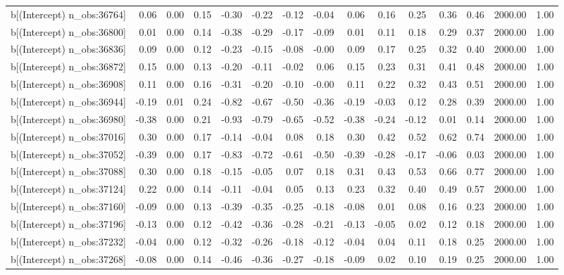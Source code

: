 \begin{table}[ht]
\begin{tabular}{rrrrrrrrrrrrrrr}
  b[(Intercept) n\_obs:36764] & 0.06 & 0.00 & 0.15 & -0.30 & -0.22 & -0.12 & -0.04 & 0.06 & 0.16 & 0.25 & 0.36 & 0.46 & 2000.00 & 1.00 \\ 
  b[(Intercept) n\_obs:36800] & 0.01 & 0.00 & 0.14 & -0.38 & -0.29 & -0.17 & -0.09 & 0.01 & 0.11 & 0.18 & 0.29 & 0.37 & 2000.00 & 1.00 \\ 
  b[(Intercept) n\_obs:36836] & 0.09 & 0.00 & 0.12 & -0.23 & -0.15 & -0.08 & -0.00 & 0.09 & 0.17 & 0.25 & 0.32 & 0.40 & 2000.00 & 1.00 \\ 
  b[(Intercept) n\_obs:36872] & 0.15 & 0.00 & 0.13 & -0.20 & -0.11 & -0.02 & 0.06 & 0.15 & 0.23 & 0.31 & 0.41 & 0.48 & 2000.00 & 1.00 \\ 
  b[(Intercept) n\_obs:36908] & 0.11 & 0.00 & 0.16 & -0.31 & -0.20 & -0.10 & -0.00 & 0.11 & 0.22 & 0.32 & 0.43 & 0.51 & 2000.00 & 1.00 \\ 
  b[(Intercept) n\_obs:36944] & -0.19 & 0.01 & 0.24 & -0.82 & -0.67 & -0.50 & -0.36 & -0.19 & -0.03 & 0.12 & 0.28 & 0.39 & 2000.00 & 1.00 \\ 
  b[(Intercept) n\_obs:36980] & -0.38 & 0.00 & 0.21 & -0.93 & -0.79 & -0.65 & -0.52 & -0.38 & -0.24 & -0.12 & 0.01 & 0.14 & 2000.00 & 1.00 \\ 
  b[(Intercept) n\_obs:37016] & 0.30 & 0.00 & 0.17 & -0.14 & -0.04 & 0.08 & 0.18 & 0.30 & 0.42 & 0.52 & 0.62 & 0.74 & 2000.00 & 1.00 \\ 
  b[(Intercept) n\_obs:37052] & -0.39 & 0.00 & 0.17 & -0.83 & -0.72 & -0.61 & -0.50 & -0.39 & -0.28 & -0.17 & -0.06 & 0.03 & 2000.00 & 1.00 \\ 
  b[(Intercept) n\_obs:37088] & 0.30 & 0.00 & 0.18 & -0.15 & -0.05 & 0.07 & 0.18 & 0.31 & 0.43 & 0.53 & 0.66 & 0.77 & 2000.00 & 1.00 \\ 
  b[(Intercept) n\_obs:37124] & 0.22 & 0.00 & 0.14 & -0.11 & -0.04 & 0.05 & 0.13 & 0.23 & 0.32 & 0.40 & 0.49 & 0.57 & 2000.00 & 1.00 \\ 
  b[(Intercept) n\_obs:37160] & -0.09 & 0.00 & 0.13 & -0.39 & -0.35 & -0.25 & -0.18 & -0.08 & 0.01 & 0.08 & 0.16 & 0.23 & 2000.00 & 1.00 \\ 
  b[(Intercept) n\_obs:37196] & -0.13 & 0.00 & 0.12 & -0.42 & -0.36 & -0.28 & -0.21 & -0.13 & -0.05 & 0.02 & 0.12 & 0.18 & 2000.00 & 1.00 \\ 
  b[(Intercept) n\_obs:37232] & -0.04 & 0.00 & 0.12 & -0.32 & -0.26 & -0.18 & -0.12 & -0.04 & 0.04 & 0.11 & 0.18 & 0.25 & 2000.00 & 1.00 \\ 
  b[(Intercept) n\_obs:37268] & -0.08 & 0.00 & 0.14 & -0.46 & -0.36 & -0.27 & -0.18 & -0.09 & 0.02 & 0.10 & 0.19 & 0.25 & 2000.00 & 1.00 \\ 

\end{tabular}
\end{table}
